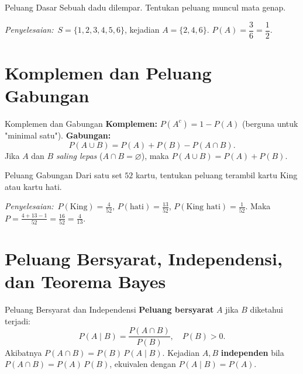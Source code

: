\documentclass[11pt,a4paper]{report}
\theoremstyle{gaya}
\newcommand{\jawab}{\par\smallskip\noindent\textit{\textcolor{oranye}{Penyelesaian:}}\ }
\begin{document}
\begin{contoh}{Peluang Dasar}
Sebuah dadu dilempar. Tentukan peluang muncul mata genap.

\jawab $S=\{1,2,3,4,5,6\}$, kejadian $A=\{2,4,6\}$. $P(A)=\dfrac{3}{6}=\dfrac12$.
\end{contoh}

\section{Komplemen dan Peluang Gabungan}
\begin{konsep}{Komplemen dan Gabungan}
\textbf{Komplemen:} $P(A^c)=1-P(A)$ (berguna untuk "minimal satu"). \textbf{Gabungan:}
\[
P(A\cup B)=P(A)+P(B)-P(A\cap B).
\]
Jika $A$ dan $B$ \emph{saling lepas} ($A\cap B=\varnothing$), maka $P(A\cup B)=P(A)+P(B)$.
\end{konsep}

\begin{contoh}{Peluang Gabungan}
Dari satu set $52$ kartu, tentukan peluang terambil kartu King atau kartu hati.

\jawab $P(\text{King})=\tfrac{4}{52}$, $P(\text{hati})=\tfrac{13}{52}$, $P(\text{King hati})=\tfrac{1}{52}$. Maka $P=\tfrac{4+13-1}{52}=\tfrac{16}{52}=\tfrac{4}{13}$.
\end{contoh}

\section{Peluang Bersyarat, Independensi, dan Teorema Bayes}
\begin{konsep}{Peluang Bersyarat dan Independensi}
\textbf{Peluang bersyarat} $A$ jika $B$ diketahui terjadi:
\[
P(A\mid B)=\frac{P(A\cap B)}{P(B)},\quad P(B)>0.
\]
Akibatnya $P(A\cap B)=P(B)\,P(A\mid B)$. Kejadian $A,B$ \textbf{independen} bila $P(A\cap B)=P(A)\,P(B)$, ekuivalen dengan $P(A\mid B)=P(A)$.
\end{konsep}
\end{document}
